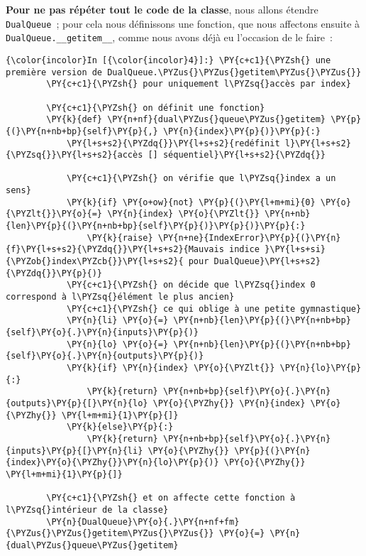 \textbf{Pour ne pas répéter tout le code de la classe}, nous allons
étendre \texttt{DualQueue}~; pour cela nous définissons une fonction,
que nous affectons ensuite à \texttt{DualQueue.\_\_getitem\_\_}, comme
nous avons déjà eu l'occasion de le faire~:

    \begin{Verbatim}[commandchars=\\\{\}]
{\color{incolor}In [{\color{incolor}4}]:} \PY{c+c1}{\PYZsh{} une première version de DualQueue.\PYZus{}\PYZus{}getitem\PYZus{}\PYZus{}}
        \PY{c+c1}{\PYZsh{} pour uniquement l\PYZsq{}accès par index}
        
        \PY{c+c1}{\PYZsh{} on définit une fonction}
        \PY{k}{def} \PY{n+nf}{dual\PYZus{}queue\PYZus{}getitem} \PY{p}{(}\PY{n+nb+bp}{self}\PY{p}{,} \PY{n}{index}\PY{p}{)}\PY{p}{:}
            \PY{l+s+s2}{\PYZdq{}}\PY{l+s+s2}{redéfinit l}\PY{l+s+s2}{\PYZsq{}}\PY{l+s+s2}{accès [] séquentiel}\PY{l+s+s2}{\PYZdq{}}
        
            \PY{c+c1}{\PYZsh{} on vérifie que l\PYZsq{}index a un sens}
            \PY{k}{if} \PY{o+ow}{not} \PY{p}{(}\PY{l+m+mi}{0} \PY{o}{\PYZlt{}}\PY{o}{=} \PY{n}{index} \PY{o}{\PYZlt{}} \PY{n+nb}{len}\PY{p}{(}\PY{n+nb+bp}{self}\PY{p}{)}\PY{p}{)}\PY{p}{:}
                \PY{k}{raise} \PY{n+ne}{IndexError}\PY{p}{(}\PY{n}{f}\PY{l+s+s2}{\PYZdq{}}\PY{l+s+s2}{Mauvais indice }\PY{l+s+si}{\PYZob{}index\PYZcb{}}\PY{l+s+s2}{ pour DualQueue}\PY{l+s+s2}{\PYZdq{}}\PY{p}{)}
            \PY{c+c1}{\PYZsh{} on décide que l\PYZsq{}index 0 correspond à l\PYZsq{}élément le plus ancien}
            \PY{c+c1}{\PYZsh{} ce qui oblige à une petite gymnastique}
            \PY{n}{li} \PY{o}{=} \PY{n+nb}{len}\PY{p}{(}\PY{n+nb+bp}{self}\PY{o}{.}\PY{n}{inputs}\PY{p}{)}
            \PY{n}{lo} \PY{o}{=} \PY{n+nb}{len}\PY{p}{(}\PY{n+nb+bp}{self}\PY{o}{.}\PY{n}{outputs}\PY{p}{)}
            \PY{k}{if} \PY{n}{index} \PY{o}{\PYZlt{}} \PY{n}{lo}\PY{p}{:}
                \PY{k}{return} \PY{n+nb+bp}{self}\PY{o}{.}\PY{n}{outputs}\PY{p}{[}\PY{n}{lo} \PY{o}{\PYZhy{}} \PY{n}{index} \PY{o}{\PYZhy{}} \PY{l+m+mi}{1}\PY{p}{]}
            \PY{k}{else}\PY{p}{:}
                \PY{k}{return} \PY{n+nb+bp}{self}\PY{o}{.}\PY{n}{inputs}\PY{p}{[}\PY{n}{li} \PY{o}{\PYZhy{}} \PY{p}{(}\PY{n}{index}\PY{o}{\PYZhy{}}\PY{n}{lo}\PY{p}{)} \PY{o}{\PYZhy{}} \PY{l+m+mi}{1}\PY{p}{]}
        
        \PY{c+c1}{\PYZsh{} et on affecte cette fonction à l\PYZsq{}intérieur de la classe}
        \PY{n}{DualQueue}\PY{o}{.}\PY{n+nf+fm}{\PYZus{}\PYZus{}getitem\PYZus{}\PYZus{}} \PY{o}{=} \PY{n}{dual\PYZus{}queue\PYZus{}getitem}
\end{Verbatim}


